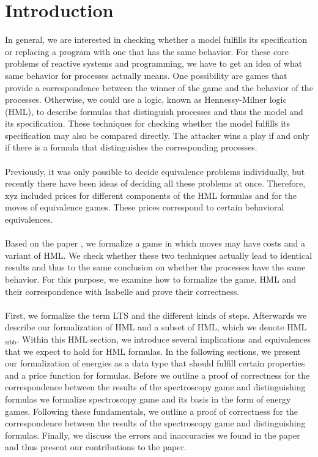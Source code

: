 \newpage
\section{Introduction} %
In general, we are interested in checking whether a model fulfills its specification or replacing a program with one that has the same behavior.
For these core problems of reactive systems and programming, we have to get an idea of what same behavior for processes actually means.
One possibility are games that provide a correspondence between the winner of the game and the behavior of the processes.
Otherwise, we could use a logic, known as Hennessy-Milner logic (HML), to describe formulas that distinguish processes and thus the model and its specification.
These techniques for checking whether the model fulfills its specification may also be compared directly.
The attacker wins a play if and only if there is a formula that distinguishes the corresponding processes.
\\\\
Previously, it was only possible to decide equivalence problems individually, but recently there have been ideas of deciding all these problems at once.
Therefore, xyz included prices for different components of the HML formulas and for the moves of equivalence games.
These prices correspond to certain behavioral equivalences.
\\\\
Based on the paper \cite{bisping2023lineartimebranchingtime}, we formalize a game in which moves may have costs and a variant of HML.
We check whether these two techniques actually lead to identical results and thus to the same conclusion on whether the processes have the same behavior.
For this purpose, we examine how to formalize the game, HML and their correspondence with Isabelle and prove their correctness.
\\\\
First, we formalize the term LTS and the different kinds of steps.
Afterwards we describe our formalization of HML and a subset of HML, which we denote HML$_\text{srbb}$.
Within this HML section, we introduce several implications and equivalences that we expect to hold for HML formulas.
In the following sections, we present our formalization of energies as a data type that should fulfill certain properties and a price function for formulas.
Before we outline a proof of correctness for the correspondence between the results of the spectroscopy game and distinguishing formulas we formalize spectroscopy game and its basis in the form of energy games.
Following these fundamentals, we outline a proof of correctness for the correspondence between the results of the spectroscopy game and distinguishing formulas.
Finally, we discuss the errors and inaccuracies we found in the paper and thus present our contributions to the paper\cite{bisping2023lineartimebranchingtime}.